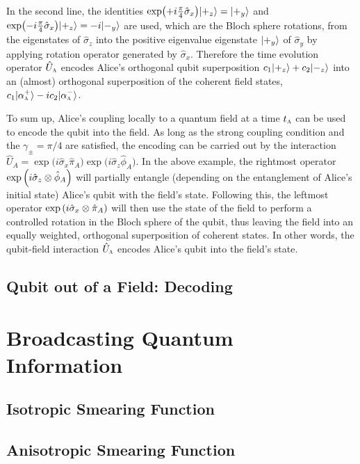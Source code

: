 \documentclass[a4paper,12pt]{article}
\begin{document}
In the second line, the identities $\exp(+ i \frac{\pi}{4}\hat\sigma_x) | +_z \rangle = | +_y \rangle $ and $\exp(- i \frac{\pi}{4}\hat\sigma_x) | +_z \rangle =-i | -_y \rangle $ are used, which are the Bloch sphere rotations, from the eigenstates of $\hat\sigma_z$ into the positive eigenvalue eigenstate $ | +_y \rangle $ of $\hat\sigma_y$ by applying rotation operator generated by $\hat\sigma_x$. 
Therefore the time evolution operator $\hat U_\textsc{a}$ encodes Alice's orthogonal qubit superposition $c_1| +_z \rangle +c_2 | -_z \rangle $ into an (almost) orthogonal superposition of the coherent field states, $c_1| \alpha_\textsc{a}^+ \rangle- i c_2 | \alpha_\textsc{a}^{-} \rangle $.

To sum up, Alice's coupling locally to a quantum field at a time $t_\textsc{a}$ can be used to encode the qubit into the field.
As long as the strong coupling condition and the $\gamma_{ \pm } = \pi / 4$ are satisfied, the encoding can be carried out by the interaction $\hat U_A = \exp\big(i\hat\sigma_x\hat \pi_A\big)\exp\big(i\hat\sigma_z\hat \phi_A \big)$. 
In the above example, the rightmost operator $\exp\left( i\hat\sigma_z \otimes \hat \phi_A \right)$ will partially entangle (depending on the entanglement of Alice's initial state) Alice's qubit with the field's state. 
Following this, the leftmost operator $\exp\left( i \hat \sigma_x \otimes \hat\pi_A \right)$ will then use the state of the field to perform a controlled rotation in the Bloch sphere of the qubit, thus leaving the field into an equally weighted, orthogonal superposition of coherent states. 
In other words, the qubit-field interaction $\hat U_\textsc{a}$ encodes Alice's qubit into the field's state.


\subsection*{Qubit out of a Field: Decoding}


\section{Broadcasting Quantum Information}

\subsection*{Isotropic Smearing Function}

\subsection*{Anisotropic Smearing Function}
\end{document}
